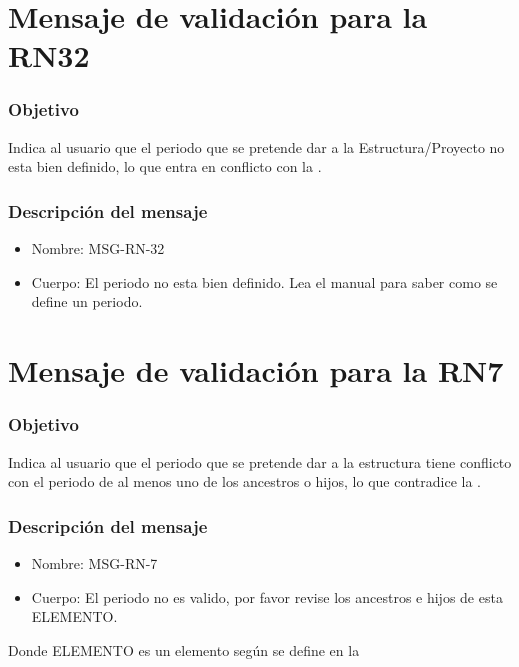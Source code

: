 
\section{Mensaje de validación para la RN32} \label{MSG_RN32}

\subsubsection{Objetivo}
Indica al usuario que el periodo que se pretende dar a la Estructura/Proyecto no esta bien definido, lo que entra en conflicto con la .

\subsubsection{Descripción del mensaje}
\begin{itemize}
\item Nombre: MSG-RN-32
\item Cuerpo: El periodo no esta bien definido. Lea el manual para saber como se define un periodo.
\end{itemize}

\section{Mensaje de validación para la RN7} \label{MSG_RN7}

\subsubsection{Objetivo}
Indica al usuario que el periodo que se pretende dar a la estructura tiene conflicto con el periodo de al menos uno de los ancestros o hijos, lo que contradice la .

\subsubsection{Descripción del mensaje}
\begin{itemize}
\item Nombre: MSG-RN-7
\item Cuerpo: El periodo no es valido, por favor revise los ancestros e hijos de esta ELEMENTO.
\end{itemize}
Donde ELEMENTO es un elemento según se define en la 

